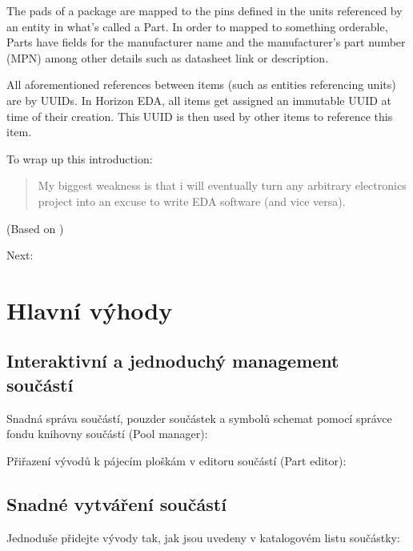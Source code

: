 \documentclass[letterpaper,10pt,czech]{sphinxmanual}
\begin{document}
The pads of a package are mapped to the pins defined in the units
referenced by an entity in what’s called a Part. In order to mapped to
something orderable, Parts have fields for the manufacturer name and
the manufacturer’s part number (MPN) among other details such as
datasheet link or description.

All aforementioned references between items (such as entities
referencing units) are by UUIDs. In Horizon EDA, all items get assigned
an immutable UUID at time of their creation. This UUID is then used by
other items to reference this item.

To wrap up this introduction:
\begin{quote}

My biggest weakness is that i will eventually turn any arbitrary
electronics project into an excuse to write EDA software (and vice
versa).
\end{quote}

(Based on )

Next: {\hyperref[\detokenize{feature-overview::doc}]{}}


\chapter{Hlavní výhody}
\label{\detokenize{feature-overview:hlavni-vyhody}}\label{\detokenize{feature-overview::doc}}

\section{Interaktivní a jednoduchý management součástí}
\label{\detokenize{feature-overview:interaktivni-a-jednoduchy-management-soucasti}}
Snadná správa součástí, pouzder součástek a symbolů schemat pomocí správce fondu knihovny součástí (Pool manager):

\noindent{}

Přiřazení vývodů k pájecím ploškám v editoru součástí (Part editor):

\noindent{}


\section{Snadné vytváření součástí}
\label{\detokenize{feature-overview:snadne-vytvareni-soucasti}}
Jednoduše přidejte vývody tak, jak jsou uvedeny v katalogovém listu součástky:
\end{document}
